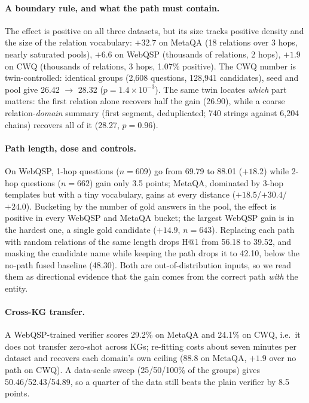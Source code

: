 \documentclass[sigconf,review]{acmart}
\begin{document}
\paragraph{A boundary rule, and what the path must contain.}
The effect is positive on all three datasets, but its size tracks positive density and the size of the relation vocabulary: $+32.7$ on MetaQA (18 relations over 3 hops, nearly saturated pools), $+6.6$ on WebQSP (thousands of relations, 2 hops), $+1.9$ on CWQ (thousands of relations, 3 hops, 1.07\% positive). The CWQ number is twin-controlled: identical groups (2{,}608 questions, 128{,}941 candidates), seed and pool give 26.42 $\rightarrow$ 28.32 ($p=1.4\times10^{-3}$). The same twin locates \emph{which} part matters: the first relation alone recovers half the gain (26.90), while a coarse relation-\emph{domain} summary (first segment, deduplicated; 740 strings against 6{,}204 chains) recovers all of it (28.27, $p=0.96$).

\paragraph{Path length, dose and controls.}
On WebQSP, 1-hop questions ($n=609$) go from 69.79 to 88.01 ($+18.2$) while 2-hop questions ($n=662$) gain only 3.5 points; MetaQA, dominated by 3-hop templates but with a tiny vocabulary, gains at every distance ($+18.5$/$+30.4$/$+24.0$). Bucketing by the number of gold answers in the pool, the effect is positive in every WebQSP and MetaQA bucket; the largest WebQSP gain is in the hardest one, a single gold candidate ($+14.9$, $n=643$). Replacing each path with random relations of the same length drops H@1 from 56.18 to 39.52, and masking the candidate name while keeping the path drops it to 42.10, below the no-path fused baseline (48.30). Both are out-of-distribution inputs, so we read them as directional evidence that the gain comes from the correct path \emph{with} the entity.

\paragraph{Cross-KG transfer.}
A WebQSP-trained verifier scores 29.2\% on MetaQA and 24.1\% on CWQ, i.e.\ it does not transfer zero-shot across KGs; re-fitting costs about seven minutes per dataset and recovers each domain's own ceiling (88.8 on MetaQA, $+1.9$ over no path on CWQ). A data-scale sweep (25/50/100\% of the groups) gives 50.46/52.43/54.89, so a quarter of the data still beats the plain verifier by 8.5 points.
\end{document}
